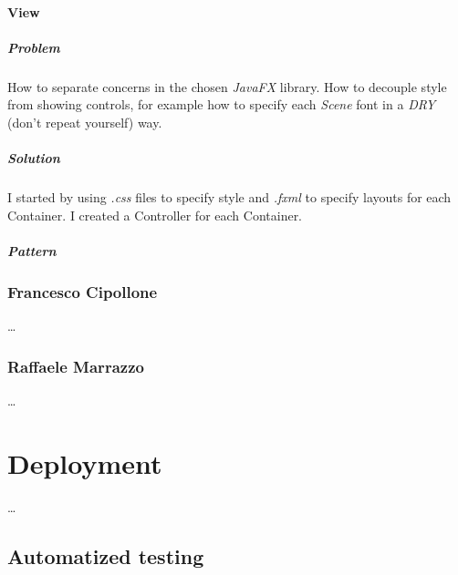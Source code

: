 \documentclass[12pt, a4paper]{report}
\begin{document}
        \pagebreak

        \subsubsection{View}

            \paragraph{Problem}

            How to separate concerns in the chosen \emph{JavaFX} library.
            How to decouple style from showing controls, for example how to specify each \emph{Scene} font in a \emph{DRY} (don't repeat yourself) way.

            \paragraph{Solution}

            I started by using \textit{.css} files to specify style and \textit{.fxml} to specify layouts for each Container.
            I created a Controller for each Container.

            \paragraph{Pattern}

            
        \pagebreak

    \subsection*{Francesco Cipollone}

    \dots

    \subsection*{Raffaele Marrazzo}

    \dots

\chapter{Deployment}

    \dots

\section{Automatized testing}
\end{document}
